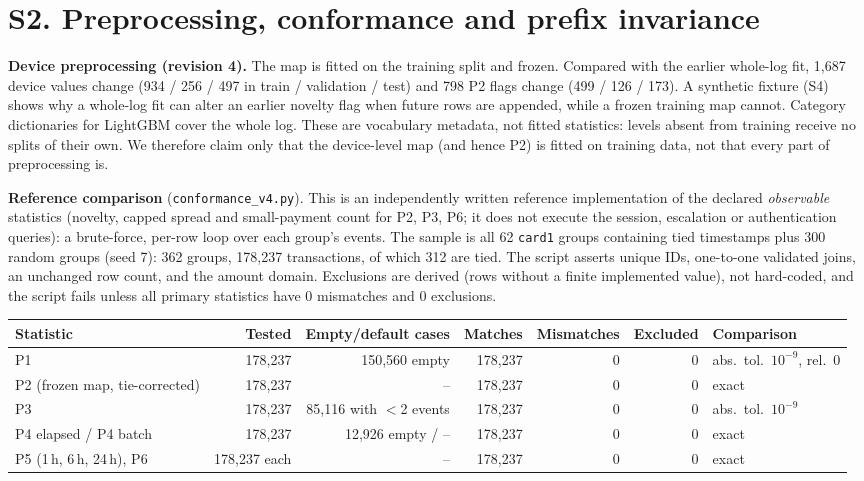 \documentclass[10pt]{article}
\newcommand{\tf}[1]{\texttt{#1}}
\begin{document}
\section*{S2. Preprocessing, conformance and prefix invariance}
\textbf{Device preprocessing (revision 4).} The map is fitted on the training split and frozen. Compared with the earlier whole-log fit, 1,687 device values change (934 / 256 / 497 in train / validation / test) and 798 P2 flags change (499 / 126 / 173). A synthetic fixture (S4) shows why a whole-log fit can alter an earlier novelty flag when future rows are appended, while a frozen training map cannot. Category dictionaries for LightGBM cover the whole log. These are vocabulary metadata, not fitted statistics: levels absent from training receive no splits of their own. We therefore claim only that the device-level map (and hence P2) is fitted on training data, not that every part of preprocessing is.

\textbf{Reference comparison} (\tf{conformance\_v4.py}). This is an independently written reference implementation of the declared \emph{observable} statistics (novelty, capped spread and small-payment count for P2, P3, P6; it does not execute the session, escalation or authentication queries): a brute-force, per-row loop over each group's events. The sample is all 62 \tf{card1} groups containing tied timestamps plus 300 random groups (seed 7): 362 groups, 178,237 transactions, of which 312 are tied. The script asserts unique IDs, one-to-one validated joins, an unchanged row count, and the amount domain. Exclusions are derived (rows without a finite implemented value), not hard-coded, and the script fails unless all primary statistics have 0 mismatches and 0 exclusions.

\begin{center}\footnotesize
\begin{tabular}{@{}lrrrrrl@{}}
\toprule
Statistic & Tested & Empty/default cases & Matches & Mismatches & Excluded & Comparison \\
\midrule
P1 & 178,237 & 150,560 empty & 178,237 & 0 & 0 & abs.\ tol.\ $10^{-9}$, rel.\ 0 \\
P2 (frozen map, tie-corrected) & 178,237 & -- & 178,237 & 0 & 0 & exact \\
P3 & 178,237 & 85,116 with $<$2 events & 178,237 & 0 & 0 & abs.\ tol.\ $10^{-9}$ \\
P4 elapsed / P4 batch & 178,237 & 12,926 empty / -- & 178,237 & 0 & 0 & exact \\
P5 (1\,h, 6\,h, 24\,h), P6 & 178,237 each & -- & 178,237 & 0 & 0 & exact \\
\bottomrule
\end{tabular}\end{center}
\end{document}
